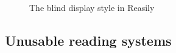 \begin{figure}[H]
	\centering
	\caption{The blind display style in Reasily}
	\label{fig:reasilyBl}
\end{figure}

\subsection{Unusable reading systems}

